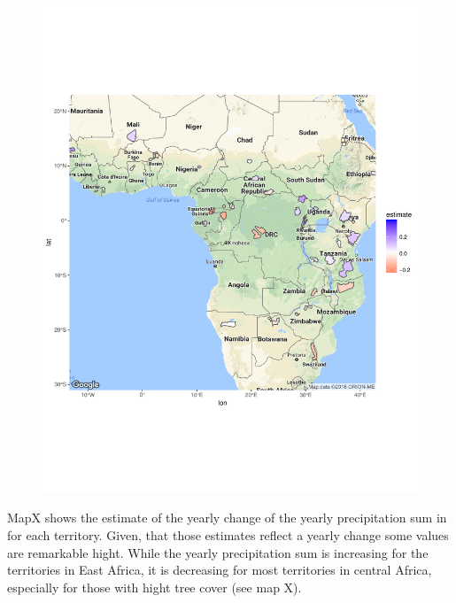 \begin{center}
	\begin{figure}[h]
		\begin{center}
			\includegraphics[width=15cm]{images/sample_session_3_change_map.pdf}
		\end{center}
	\end{figure}
\end{center}



MapX shows the estimate of the yearly change of the yearly precipitation sum in for each territory. Given, that those estimates reflect a yearly change some values are remarkable hight. While the yearly precipitation sum is increasing for the territories in East Africa, it is decreasing for most territories in central Africa, especially for those with hight tree cover (see map X).

